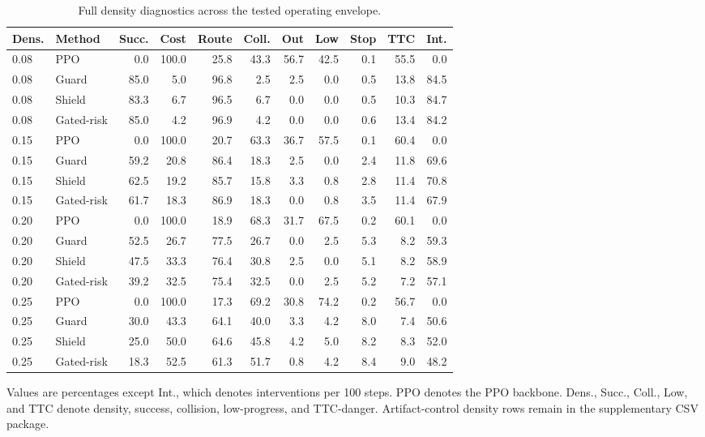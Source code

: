 \begin{table}[!htbp]
\centering
\caption{Full density diagnostics across the tested operating envelope.}
\label{tab_full_density}
\scriptsize
\setlength{\tabcolsep}{1.7pt}
\renewcommand{\arraystretch}{1.05}
\begin{tabular}{@{}llrrrrrrrrr@{}}
\toprule
Dens. & Method & Succ. & Cost & Route & Coll. & Out & Low & Stop & TTC & Int. \\
\midrule
0.08 & PPO & 0.0 & 100.0 & 25.8 & 43.3 & 56.7 & 42.5 & 0.1 & 55.5 & 0.0 \\
0.08 & Guard & 85.0 & 5.0 & 96.8 & 2.5 & 2.5 & 0.0 & 0.5 & 13.8 & 84.5 \\
0.08 & Shield & 83.3 & 6.7 & 96.5 & 6.7 & 0.0 & 0.0 & 0.5 & 10.3 & 84.7 \\
0.08 & Gated-risk & 85.0 & 4.2 & 96.9 & 4.2 & 0.0 & 0.0 & 0.6 & 13.4 & 84.2 \\
0.15 & PPO & 0.0 & 100.0 & 20.7 & 63.3 & 36.7 & 57.5 & 0.1 & 60.4 & 0.0 \\
0.15 & Guard & 59.2 & 20.8 & 86.4 & 18.3 & 2.5 & 0.0 & 2.4 & 11.8 & 69.6 \\
0.15 & Shield & 62.5 & 19.2 & 85.7 & 15.8 & 3.3 & 0.8 & 2.8 & 11.4 & 70.8 \\
0.15 & Gated-risk & 61.7 & 18.3 & 86.9 & 18.3 & 0.0 & 0.8 & 3.5 & 11.4 & 67.9 \\
0.20 & PPO & 0.0 & 100.0 & 18.9 & 68.3 & 31.7 & 67.5 & 0.2 & 60.1 & 0.0 \\
0.20 & Guard & 52.5 & 26.7 & 77.5 & 26.7 & 0.0 & 2.5 & 5.3 & 8.2 & 59.3 \\
0.20 & Shield & 47.5 & 33.3 & 76.4 & 30.8 & 2.5 & 0.0 & 5.1 & 8.2 & 58.9 \\
0.20 & Gated-risk & 39.2 & 32.5 & 75.4 & 32.5 & 0.0 & 2.5 & 5.2 & 7.2 & 57.1 \\
0.25 & PPO & 0.0 & 100.0 & 17.3 & 69.2 & 30.8 & 74.2 & 0.2 & 56.7 & 0.0 \\
0.25 & Guard & 30.0 & 43.3 & 64.1 & 40.0 & 3.3 & 4.2 & 8.0 & 7.4 & 50.6 \\
0.25 & Shield & 25.0 & 50.0 & 64.6 & 45.8 & 4.2 & 5.0 & 8.2 & 8.3 & 52.0 \\
0.25 & Gated-risk & 18.3 & 52.5 & 61.3 & 51.7 & 0.8 & 4.2 & 8.4 & 9.0 & 48.2 \\
\bottomrule
\end{tabular}
\begin{tablenotes}
\item Values are percentages except Int., which denotes interventions per 100 steps. PPO denotes the PPO backbone. Dens., Succ., Coll., Low, and TTC denote density, success, collision, low-progress, and TTC-danger. Artifact-control density rows remain in the supplementary CSV package.
\end{tablenotes}
\end{table}
